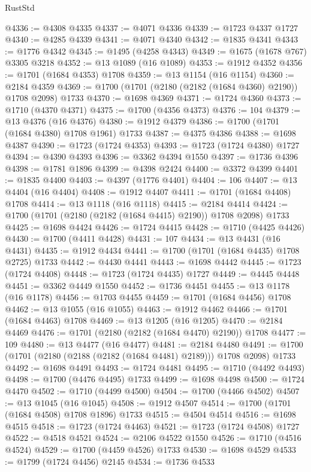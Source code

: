 \begin{lexlean}{RustStd}
\begin{coremodule}
@4336 := @4308 @4335
@4337 := @4071 @4336
@4339 := @1723 @4337 @1727
@4340 := @4285 @4339
@4341 := @4071 @4340
@4342 := @1835 @4341
@4343 := @1776 @4342
@4345 := @1495 (@4258 @4343)
@4349 := @1675 (@1678 @767) @3305 @3218
@4352 := @13 @1089 (@16 @1089)
@4353 := @1912 @4352
@4356 := @1701 (@1684 @4353) @1708
@4359 := @13 @1154 (@16 @1154)
@4360 := @2184 @4359
@4369 := @1700 (@1701 (@2180 (@2182 (@1684 @4360) @2190)) @1708 @2098) @1733
@4370 := @1698 @4369
@4371 := @1724 @4360
@4373 := @1710 (@4370 @4371)
@4375 := @1700 (@4356 @4373)
@4376 := 104
@4379 := @13 @4376 (@16 @4376)
@4380 := @1912 @4379
@4386 := @1700 (@1701 (@1684 @4380) @1708 @1961) @1733
@4387 := @4375 @4386
@4388 := @1698 @4387
@4390 := @1723 (@1724 @4353)
@4393 := @1723 (@1724 @4380) @1727
@4394 := @4390 @4393
@4396 := @3362 @4394 @1550
@4397 := @1736 @4396
@4398 := @1781 @1896
@4399 := @4398 @2424
@4400 := @3372 @4399
@4401 := @1835 @4400
@4403 := @4397 (@1776 @4401)
@4404 := 106
@4407 := @13 @4404 (@16 @4404)
@4408 := @1912 @4407
@4411 := @1701 (@1684 @4408) @1708
@4414 := @13 @1118 (@16 @1118)
@4415 := @2184 @4414
@4424 := @1700 (@1701 (@2180 (@2182 (@1684 @4415) @2190)) @1708 @2098) @1733
@4425 := @1698 @4424
@4426 := @1724 @4415
@4428 := @1710 (@4425 @4426)
@4430 := @1700 (@4411 @4428)
@4431 := 107
@4434 := @13 @4431 (@16 @4431)
@4435 := @1912 @4434
@4441 := @1700 (@1701 (@1684 @4435) @1708 @2725) @1733
@4442 := @4430 @4441
@4443 := @1698 @4442
@4445 := @1723 (@1724 @4408)
@4448 := @1723 (@1724 @4435) @1727
@4449 := @4445 @4448
@4451 := @3362 @4449 @1550
@4452 := @1736 @4451
@4455 := @13 @1178 (@16 @1178)
@4456 := @1703 @4455
@4459 := @1701 (@1684 @4456) @1708
@4462 := @13 @1055 (@16 @1055)
@4463 := @1912 @4462
@4466 := @1701 (@1684 @4463) @1708
@4469 := @13 @1205 (@16 @1205)
@4470 := @2184 @4469
@4476 := @1701 (@2180 (@2182 (@1684 @4470) @2190)) @1708
@4477 := 109
@4480 := @13 @4477 (@16 @4477)
@4481 := @2184 @4480
@4491 := @1700 (@1701 (@2180 (@2188 (@2182 (@1684 @4481) @2189))) @1708 @2098) @1733
@4492 := @1698 @4491
@4493 := @1724 @4481
@4495 := @1710 (@4492 @4493)
@4498 := @1700 (@4476 @4495) @1733
@4499 := @1698 @4498
@4500 := @1724 @4470
@4502 := @1710 (@4499 @4500)
@4504 := @1700 (@4466 @4502)
@4507 := @13 @1045 (@16 @1045)
@4508 := @1912 @4507
@4514 := @1700 (@1701 (@1684 @4508) @1708 @1896) @1733
@4515 := @4504 @4514
@4516 := @1698 @4515
@4518 := @1723 (@1724 @4463)
@4521 := @1723 (@1724 @4508) @1727
@4522 := @4518 @4521
@4524 := @2106 @4522 @1550
@4526 := @1710 (@4516 @4524)
@4529 := @1700 (@4459 @4526) @1733
@4530 := @1698 @4529
@4533 := @1799 (@1724 @4456) @2145
@4534 := @1736 @4533

\end{coremodule}
\end{lexlean}
